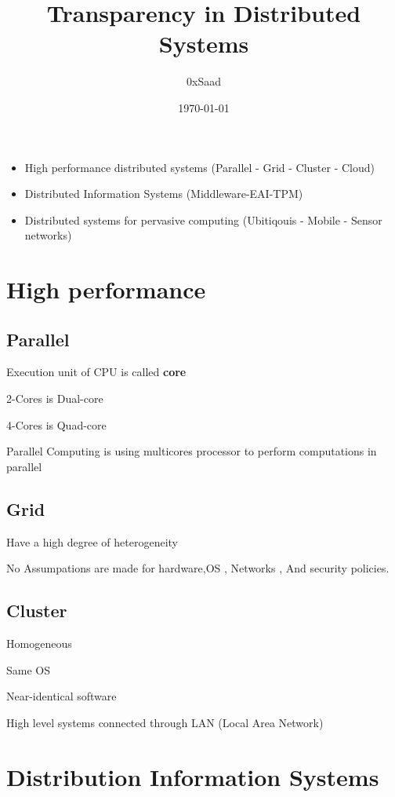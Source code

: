 \documentclass{article}
\title{Transparency in Distributed Systems}
\author{0xSaad}
\date{\today}
\begin{document}
\maketitle


\begin{itemize}
    \item High performance distributed systems (Parallel - Grid - Cluster - Cloud)
    \item Distributed Information Systems (Middleware-EAI-TPM)
    \item Distributed systems for pervasive computing (Ubitiqouis - Mobile - Sensor networks)

\end{itemize}

\section{High performance}

\subsection{Parallel}

Execution unit of CPU is called \textbf{core}

2-Cores is Dual-core

4-Cores is Quad-core

Parallel Computing is using multicores processor to perform computations in parallel

\subsection{Grid}

Have a high degree of heterogeneity

No Assumpations are made for hardware,OS , Networks , And security policies.
\subsection{Cluster}

Homogeneous

Same OS

Near-identical software

High level systems connected through LAN (Local Area Network)

\section{Distribution Information Systems}
\end{document}
